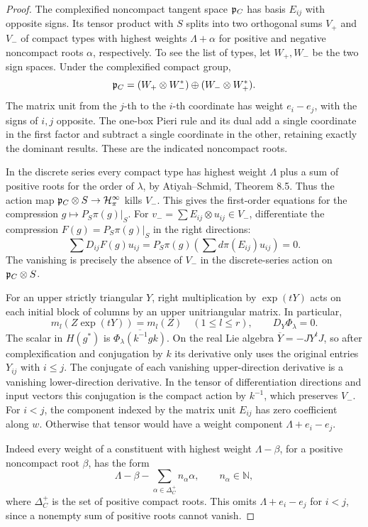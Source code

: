 \begin{proof}
The complexified noncompact tangent space \(\mathfrak p_{C}\) has
basis \(E_{ij}\) with opposite signs. Its tensor product with \(S\)
splits into two orthogonal sums \(V_+\) and \(V_-\) of compact types
with highest weights \(\Lambda+\alpha\) for positive and negative
noncompact roots \(\alpha\), respectively. To see the list of types,
let \(W_+,W_-\) be the two sign spaces. Under the complexified
compact group,
\[
 \mathfrak p_{C}=(W_+\otimes W_-^*)\oplus(W_-\otimes W_+^*).
\]
The matrix unit from the \(j\)-th to the \(i\)-th coordinate
has weight \(e_i-e_j\), with the signs of \(i,j\) opposite. The one-box Pieri rule and its dual add a single
coordinate in the first factor and subtract a single coordinate in
the other, retaining exactly the dominant results. These are the
indicated noncompact roots.

In the discrete series every compact type
has highest weight \(\Lambda\) plus a sum of positive roots for the
order of \(\lambda\), by Atiyah--Schmid, Theorem 8.5. Thus the action
map \(\mathfrak p_{C}\otimes S\to\mathcal H_\pi^\infty\) kills
\(V_-\). This gives the first-order equations for the compression
\(g\mapsto P_S\pi(g)|_S\). For \(v_-=\sum E_{ij}\otimes u_{ij}\in V_-\), differentiate
the compression \(F(g)=P_S\pi(g)|_S\) in the right directions:
\[
 \sum D_{ij}F(g)u_{ij}
   =P_S\pi(g)\left(\sum d\pi(E_{ij})u_{ij}\right)=0 .
\]
The vanishing is precisely the absence of \(V_-\) in the
discrete-series action on \(\mathfrak p_{C}\otimes S\).

For an upper strictly triangular \(Y\), right multiplication
by \(\exp(tY)\) acts on each initial block of columns by an
upper unitriangular matrix. In particular,
\[
 m_l(Z\exp(tY))=m_l(Z)\quad(1\le l\le r),\qquad D_Y\Phi_\lambda=0 .
\] The scalar in \(H(g^*)\) is
\(\overline{\Phi_\lambda(k^{-1}gk)}\). On the real Lie algebra
\(\overline Y=-JY^tJ\), so after complexification and conjugation
by \(k\) its derivative only uses the original entries \(Y_{ij}\)
with \(i\le j\). The conjugate of each vanishing upper-direction
derivative is a vanishing lower-direction derivative.
In the tensor of differentiation directions and input vectors this
conjugation is the compact action by \(k^{-1}\), which preserves
\(V_-\). For \(i<j\), the component indexed by the matrix unit \(E_{ij}\) has zero coefficient along \(w\). Otherwise that tensor would have a weight component
\(\Lambda+e_i-e_j\).

Indeed every weight of a constituent with highest weight
\(\Lambda-\beta\), for a positive noncompact root \(\beta\), has the form
\[
 \Lambda-\beta-\sum_{\alpha\in\Delta_C^+} n_\alpha\alpha,
       \qquad n_\alpha\in\mathbb N ,
\]
where \(\Delta_C^+\) is the set of positive compact roots. This
omits \(\Lambda+e_i-e_j\) for \(i<j\), since a nonempty sum of
positive roots cannot vanish. 


\end{proof}
